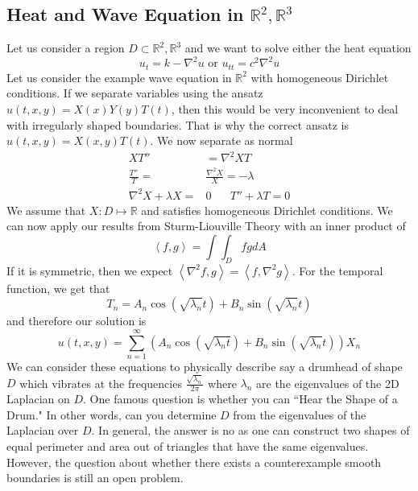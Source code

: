 \documentclass{article}
\newcommand{\R}{\mathbb{R}}
\newcommand{\twen}{\hspace{20pt}}
\newcommand{\ip}[2]{\left\langle #1,#2\right\rangle}
\newcommand{\lap}{\nabla ^2}
\theoremstyle{definition}
\begin{document}
\subsection{Heat and Wave Equation in $\R^2,\R^3$}
Let us consider a region $D \subset \R^2, \R^3$ and we want to solve either the heat equation 
\begin{equation*}
    u_t = k -\lap u \text{ or } u_{tt}=c^2\lap u
\end{equation*}
Let us consider the example wave equation in $\R^2$ with homogeneous Dirichlet conditions. If we separate variables using the ansatz $u(t,x,y) = X(x)Y(y)T(t)$, then this would be very inconvenient to deal with irregularly shaped boundaries. That is why the correct ansatz is $u(t,x,y) = X(x,y)T(t)$. We now separate as normal 
\begin{equation*}
    \begin{split}
        XT'' &= \lap XT \\
        \frac{T''}{T}=&\frac{\lap X}{X} =-\lambda \\
        \lap  X+\lambda X =& 0 \twen T''+\lambda T=0
    \end{split}
\end{equation*}
We assume that $X: D \mapsto \R$ and satisfies homogeneous Dirichlet conditions. We can now apply our results from Sturm-Liouville Theory with an inner product of 
\begin{equation*}
    \ip{f}{g} =\int \!\!\!\int_D fg dA
\end{equation*}
If it is symmetric, then we expect $\ip{\lap f}{g} = \ip{f}{\lap g}$. For the temporal function, we get that 
\begin{equation*}
    T_n = A_n \cos \left(\sqrt{\lambda_n} t\right) +B_n \sin \left( \sqrt{\lambda_n} t\right)
\end{equation*}
and therefore our solution is 
\begin{equation*}
    u(t,x,y) = \sum^\infty_{n=1} \left( A_n \cos \left(\sqrt{\lambda_n t} \right) +B_n \sin \left(\sqrt{\lambda_n} t\right) \right) X_n
\end{equation*}
We can consider these equations to physically describe say a drumhead of shape $D$ which vibrates at the frequencies $\frac{\sqrt{\lambda_n}}{2\pi}$ where $\lambda_n$ are the eigenvalues of the 2D Laplacian on $D$. One famous question is whether you can ``Hear the Shape of a Drum." In other words, can you determine $D$ from the eigenvalues of the Laplacian over $D$. In general, the answer is no as one can construct two shapes of equal perimeter and area out of triangles that have the same eigenvalues. However, the question about whether there exists a counterexample smooth boundaries is still an open problem. 
\end{document}
